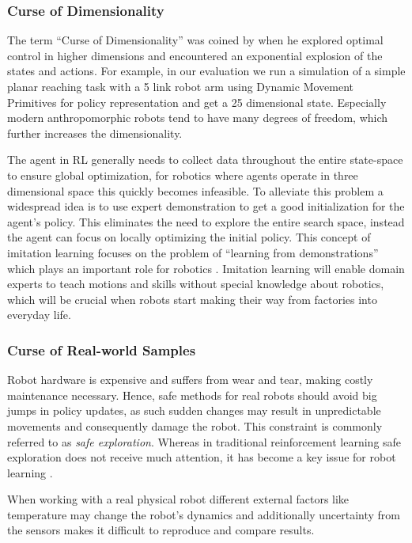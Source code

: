 \subsubsection{Curse of Dimensionality}
The term ``Curse of Dimensionality'' was coined by \citet{Bellman:1957} when
he explored optimal control in higher dimensions and encountered
an exponential explosion of the states and actions.
For example, in our evaluation we run a simulation of a
simple planar reaching task
with a 5 link robot arm using Dynamic Movement Primitives \citep{ijspeert2002learning}
for policy representation and get a 25 dimensional state.
Especially modern anthropomorphic robots tend to have many degrees of
freedom, which further increases the dimensionality.

The agent in RL generally needs to collect data throughout the entire
state-space to ensure global optimization, for robotics where agents
operate in three dimensional space this quickly becomes infeasible.
To alleviate this problem  a widespread idea is to use expert demonstration
to get a good initialization for the agent's policy. This
eliminates the need to explore the entire search space, instead the
agent can focus on locally optimizing the initial policy.
This concept of imitation learning focuses on the problem of ``learning
from demonstrations'' which plays an important role
for robotics \citep{Osaetal18}. Imitation learning
will enable domain experts to teach motions and
skills without special knowledge about robotics, which will be crucial
when robots start making their way from factories into everyday life.

\subsubsection{Curse of Real-world Samples}
Robot hardware is expensive and suffers from wear and tear, making
costly maintenance necessary. Hence, safe methods for real robots
should avoid big jumps in policy updates, as such sudden changes may
result in unpredictable movements and consequently damage the robot.
This constraint is commonly referred to as \textit{safe exploration}.
Whereas in traditional reinforcement learning
safe exploration does not receive much attention,
it has become a key issue for robot learning \citep{schneider1997exploiting}.

When working with a real physical robot
different external factors like temperature may change the robot's
dynamics and
additionally uncertainty from the sensors makes it difficult to reproduce and
compare results.

